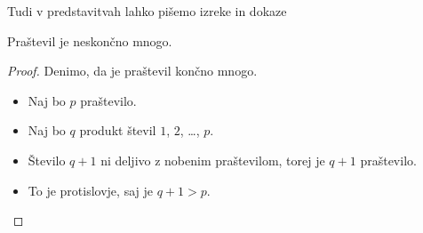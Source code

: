 \begin{frame}{Tudi v predstavitvah lahko pišemo izreke in dokaze}

	\begin{izrek}
	   Praštevil je neskončno mnogo.
	\end{izrek}
	\begin{proof}
	   Denimo, da je praštevil končno mnogo.
	   \begin{itemize}[<+->]
		  \item Naj bo $p$  praštevilo.
		  \item Naj bo $q$ produkt števil $1$, $2$, \ldots, $p$.
		  \item Število $q+1$ ni deljivo z nobenim praštevilom, torej je $q+1$ praštevilo.
		  \item To je protislovje, saj je $q+1>p$. \qedhere
	   \end{itemize}
	\end{proof}
 \end{frame}
 
